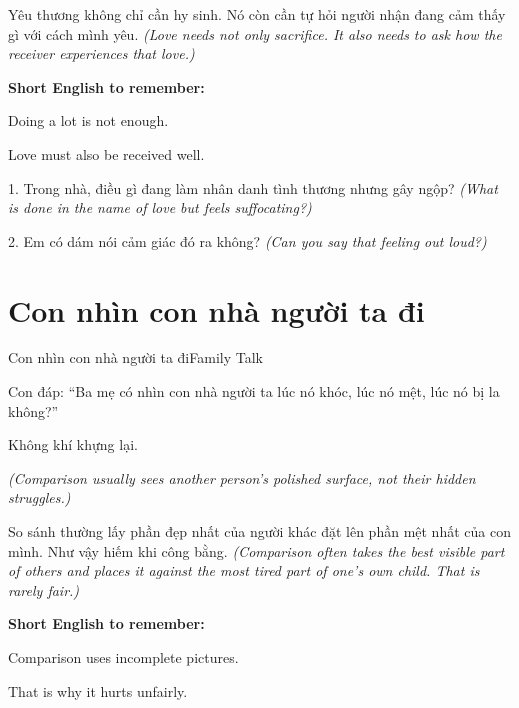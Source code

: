 \begin{baihoc}
Yêu thương không chỉ cần hy sinh. Nó còn cần tự hỏi người nhận đang cảm thấy gì với cách mình yêu.
\textit{(Love needs not only sacrifice. It also needs to ask how the receiver experiences that love.)}
\end{baihoc}

\begin{ghinhoanh}
\textbf{Short English to remember:}

Doing a lot is not enough.

Love must also be received well.
\end{ghinhoanh}

\begin{tuhocnhanh}
1. Trong nhà, điều gì đang làm nhân danh tình thương nhưng gây ngộp? \textit{(What is done in the name of love but feels suffocating?)}

2. Em có dám nói cảm giác đó ra không? \textit{(Can you say that feeling out loud?)}
\end{tuhocnhanh}
\ngancach

\section{Con nhìn con nhà người ta đi}
\begin{truyen}{Con nhìn con nhà người ta đi}{Family Talk}

Con đáp: ``Ba mẹ có nhìn con nhà người ta lúc nó khóc, lúc nó mệt, lúc nó bị la không?''

Không khí khựng lại.

\textit{(Comparison usually sees another person's polished surface, not their hidden struggles.)}
\end{truyen}

\begin{baihoc}
So sánh thường lấy phần đẹp nhất của người khác đặt lên phần mệt nhất của con mình. Như vậy hiếm khi công bằng.
\textit{(Comparison often takes the best visible part of others and places it against the most tired part of one's own child. That is rarely fair.)}
\end{baihoc}

\begin{ghinhoanh}
\textbf{Short English to remember:}

Comparison uses incomplete pictures.

That is why it hurts unfairly.
\end{ghinhoanh}

